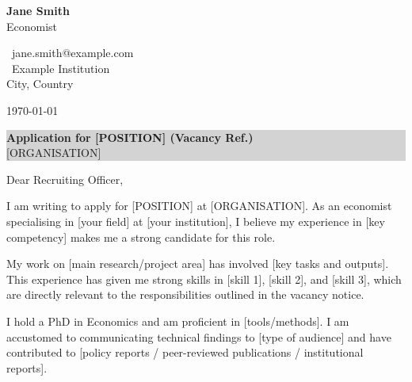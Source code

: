 \documentclass[12pt,a4paper]{article}
\begin{document}

\vspace*{0.5cm}

\begin{minipage}[t]{0.6\textwidth}
    \color{secondary}
    {\fontsize{24}{28}\selectfont\bfseries Jane Smith}\\[0.3cm]
    {\large Economist}
\end{minipage}
\begin{minipage}[t]{0.38\textwidth}
    \raggedleft
    \color{secondary}
    \small
    \faEnvelope\ jane.smith@example.com\\[0.1cm]
    \faMapMarker*\ Example Institution\\[0.1cm]
    City, Country
\end{minipage}

\vspace{1.5cm}

{\color{secondary}\small\today}

\vspace{0.8cm}

\noindent\colorbox{lightgray}{%
    \parbox{\dimexpr\textwidth-2\fboxsep}{%
        \color{primary}\textbf{Application for [POSITION] (Vacancy Ref.)}\\
        \small\color{secondary}[ORGANISATION]
    }%
}

\vspace{0.8cm}

Dear Recruiting Officer,

I am writing to apply for [POSITION] at [ORGANISATION]. As an economist specialising in [your field] at [your institution], I believe my experience in [key competency] makes me a strong candidate for this role.

My work on [main research/project area] has involved [key tasks and outputs]. This experience has given me strong skills in [skill 1], [skill 2], and [skill 3], which are directly relevant to the responsibilities outlined in the vacancy notice.

I hold a PhD in Economics and am proficient in [tools/methods]. I am accustomed to communicating technical findings to [type of audience] and have contributed to [policy reports / peer-reviewed publications / institutional reports].
\end{document}
